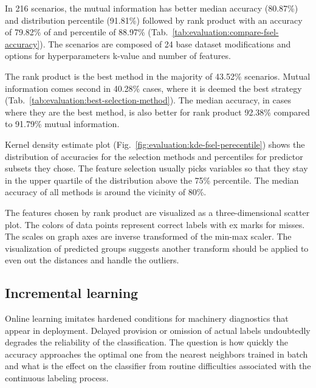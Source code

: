 In 216 scenarios, the mutual information has better median accuracy (80.87\%) and distribution percentile (91.81\%) followed by rank product with an accuracy of 79.82\% of and percentile of 88.97\% (Tab.~\ref{tab:evaluation:compare-fsel-accuracy}). The scenarios are composed of 24 base dataset modifications and options for hyperparameters k-value and number of features. 

The rank product is the best method in the majority of 43.52\% scenarios. Mutual information comes second in 40.28\% cases, where it is deemed the best strategy (Tab.~\ref{tab:evaluation:best-selection-method}). The median accuracy, in cases where they are the best method, is also better for rank product 92.38\% compared to 91.79\% mutual information. 

Kernel density estimate plot (Fig.~\ref{fig:evaluation:kde-fsel-perecentile}) shows the distribution of accuracies for the selection methods and percentiles for predictor subsets they chose. The feature selection usually picks variables so that they stay in the upper quartile of the distribution above the 75\% percentile. The median accuracy of all methods is around the vicinity of 80\%.

The features chosen by rank product are visualized as a three-dimensional scatter plot. The colors of data points represent correct labels with ex marks for misses. The scales on graph axes are inverse transformed of the min-max scaler. The visualization of predicted groups suggests another transform should be applied to even out the distances and handle the outliers.


\subsection{Incremental learning}
Online learning imitates hardened conditions for machinery diagnostics that appear in deployment. Delayed provision or omission of actual labels undoubtedly degrades the reliability of the classification. The question is how quickly the accuracy approaches the optimal one from the nearest neighbors trained in batch and what is the effect on the classifier from routine difficulties associated with the continuous labeling process.


